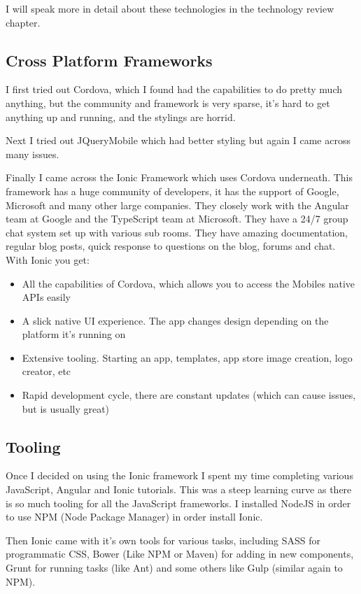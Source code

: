 I will speak more in detail about these technologies in the technology review chapter.

\subsection{Cross Platform Frameworks}

I first tried out Cordova, which I found had the capabilities to do pretty much anything, but the community and framework is very sparse, it's hard to get anything up and running, and the stylings are horrid.
\cite{https://cordova.apache.org/}

Next I tried out JQueryMobile which had better styling but again I came across many issues.
\cite{http://jquerymobile.com/}

Finally I came across the Ionic Framework which uses Cordova underneath. This framework has a huge community of developers, it has the support of Google, Microsoft and many other large companies. They closely work with the Angular team at Google and the TypeScript team at Microsoft. 
They have a 24/7 group chat system set up with various sub rooms. 
They have amazing documentation, regular blog posts, quick response to questions on the blog, forums and chat. 
With Ionic you get:
\begin{itemize}
\item All the capabilities of Cordova, which allows you to access the Mobiles native APIs easily
\item A slick native UI experience. The app changes design depending on the platform it's running on
\item Extensive tooling. Starting an app, templates, app store image creation, logo creator, etc
\item Rapid development cycle, there are constant updates (which can cause issues, but is usually great)
\end{itemize}
\cite{http://ionicframework.com/}

\subsection{Tooling}
Once I decided on using the Ionic framework I spent my time completing various JavaScript, Angular and Ionic tutorials. This was a steep learning curve as there is so much tooling for all the JavaScript frameworks.
I installed NodeJS in order to use NPM (Node Package Manager) in order install Ionic. 

Then Ionic came with it's own tools for various tasks, including SASS for programmatic CSS, Bower (Like NPM or Maven) for adding in new components, Grunt for running tasks (like Ant) and some others like Gulp (similar again to NPM).

